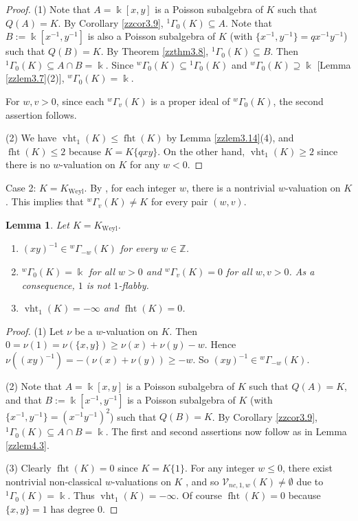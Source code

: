 \documentclass[12pt]{amsart}
\theoremstyle{plain}
\newtheorem{lemma}[theorem]{Lemma}
\numberwithin{theorem}{section}
\numberwithin{equation}{theorem}
\theoremstyle{definition}
\newcommand{\ZZ}{\mathbb{Z}}
\DeclareMathOperator{\fht}{fht}
\DeclareMathOperator{\vht}{vht}
\newcommand \calV {{\mathcal{V}}}
\DeclareMathOperator{\Weyl}{Weyl}
\newcommand \Kweyl {K_{\Weyl}}
\begin{document}
\begin{proof} (1) 
Note that $A=\Bbbk[x,y]$ is a Poisson subalgebra of $K$
such that $Q(A)=K$. By Corollary \ref{zzcor3.9}, 
${^{1}\Gamma_{0}}(K)\subseteq A$. 
Note that 
$B:=\Bbbk[x^{-1},y^{-1}]$ is also a Poisson subalgebra of $K$ 
(with $\{x^{-1},y^{-1}\}=qx^{-1}y^{-1}$) such that $Q(B)=K$. 
By Theorem \ref{zzthm3.8}, ${^{1}\Gamma_{0}}(K)\subseteq B$. 
Then ${^{1}\Gamma_{0}}(K)\subseteq A\cap B=\Bbbk$. Since ${^{w}\Gamma_{0}}(K)\subseteq 
{^{1}\Gamma_{0}}(K)$ and 
${^{w}\Gamma_{0}}(K)\supseteq \Bbbk$ [Lemma \ref{zzlem3.7}(2)],
${^{w}\Gamma_{0}}(K)=\Bbbk$. 

For $w,v>0$, since each ${^{w}\Gamma_{v}}(K)$ is a proper ideal of 
${^{w}\Gamma_{0}}(K)$, the second assertion follows.

(2) We have $\vht_1(K) \le \fht(K)$ by Lemma \ref{zzlem3.14}(4), and $\fht(K) \le 2$ because $K = K\{qxy\}$.  On the other hand, $\vht_1(K) \ge 2$ since there is no $w$-valuation on $K$ for any $w<0$.
\end{proof}


Case 2: $K=\Kweyl$. By \cite[Example 2.10]{HTWZ1}, 
for each integer $w$, there is a nontrivial $w$-valuation 
on $K$. This implies that ${^{w}\Gamma_{v}}(K)\neq K$
for every pair $(w,v)$. 

\begin{lemma}
\label{zzlem4.4}
Let $K=\Kweyl$.
\begin{enumerate}
\item[(1)]
$(xy)^{-1}\in {^{w}\Gamma_{-w}}(K)$ for every $w \in \ZZ$. 
\item[(2)]
${^{w}\Gamma_{0}}(K)=\Bbbk$ for all $w>0$ and 
${^{w}\Gamma_{v}}(K)=0$ for all $w,v>0$. As a 
consequence, $1$ is not $1$-flabby.
\item[(3)]
$\vht_1(K)= - \infty$ and $\fht(K)=0$.
\end{enumerate}
\end{lemma}

\begin{proof}
(1) Let $\nu$ be a $w$-valuation on $K$. Then 
$0=\nu(1)=\nu(\{x,y\})\geq \nu(x)+\nu(y)-w$. Hence
$\nu((xy)^{-1})=-(\nu(x)+\nu(y))\geq -w$. So 
$(xy)^{-1}\in {^{w}\Gamma_{-w}}(K)$. 

(2) Note that $A=\Bbbk[x,y]$ is a Poisson subalgebra of $K$
such that $Q(A)=K$, and that 
$B:=\Bbbk[x^{-1},y^{-1}]$ is a Poisson subalgebra of $K$ 
(with $\{x^{-1},y^{-1}\}=(x^{-1}y^{-1})^2$) such that 
$Q(B)=K$. By Corollary \ref{zzcor3.9},  ${^{1}\Gamma_{0}}(K)\subseteq A\cap B=\Bbbk$. The first and second assertions now follow as in Lemma \ref{zzlem4.3}.

(3) Clearly $\fht(K) = 0$ since $K = K\{1\}$.  
For any integer $w \le 0$, there exist 
nontrivial non-classical $w$-valuations on 
$K$ \cite[Example 2.10]{HTWZ1}, and so
$\calV_{nc,1,w}(K) \ne \emptyset$ due 
to ${^{1}\Gamma_{0}}(K) =\Bbbk$.  Thus 
$\vht_1(K)= - \infty$. Of course 
$\fht(K) = 0$ because $\{x,y\}=1$ has 
degree $0$.
\end{proof}
\end{document}
